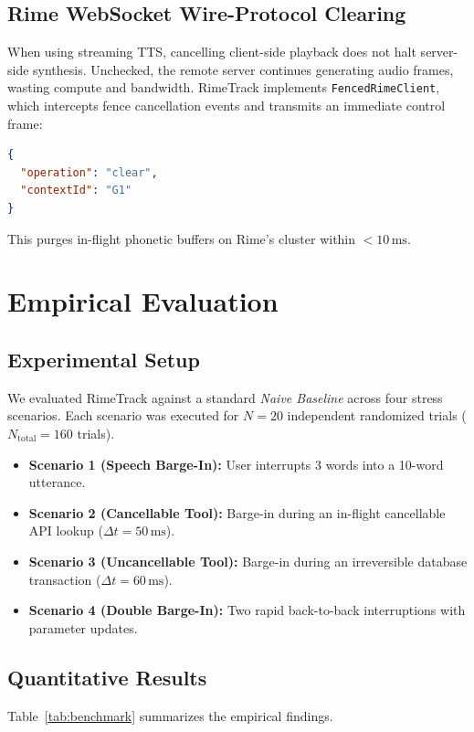 \documentclass[10pt,journal,compsoc]{IEEEtran}
\theoremstyle{definition}
\begin{document}
\subsection{Rime WebSocket Wire-Protocol Clearing}
When using streaming TTS, cancelling client-side playback does not halt server-side synthesis. Unchecked, the remote server continues generating audio frames, wasting compute and bandwidth. RimeTrack implements \texttt{FencedRimeClient}, which intercepts fence cancellation events and transmits an immediate control frame:
\begin{lstlisting}[language=json,basicstyle=\small\ttfamily]
{
  "operation": "clear",
  "contextId": "G1"
}
\end{lstlisting}
This purges in-flight phonetic buffers on Rime's cluster within $<10\,\text{ms}$.

\section{Empirical Evaluation}

\subsection{Experimental Setup}
We evaluated RimeTrack against a standard \textit{Naive Baseline} across four stress scenarios. Each scenario was executed for $N=20$ independent randomized trials ($N_{\text{total}} = 160$ trials).
\begin{itemize}
    \item \textbf{Scenario 1 (Speech Barge-In):} User interrupts 3 words into a 10-word utterance.
    \item \textbf{Scenario 2 (Cancellable Tool):} Barge-in during an in-flight cancellable API lookup ($\Delta t = 50\,\text{ms}$).
    \item \textbf{Scenario 3 (Uncancellable Tool):} Barge-in during an irreversible database transaction ($\Delta t = 60\,\text{ms}$).
    \item \textbf{Scenario 4 (Double Barge-In):} Two rapid back-to-back interruptions with parameter updates.
\end{itemize}

\subsection{Quantitative Results}
Table~\ref{tab:benchmark} summarizes the empirical findings.
\end{document}
